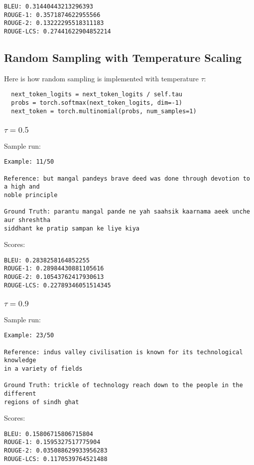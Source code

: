 \documentclass[a4paper,12pt]{article}
\begin{document}
\begin{verbatim}
BLEU: 0.31440443213296393
ROUGE-1: 0.3571874622955566
ROUGE-2: 0.13222295518311183
ROUGE-LCS: 0.27441622904852214
\end{verbatim}


\subsection{Random Sampling with Temperature Scaling}
Here is how random sampling is implemented with temperature $\tau$:
\begin{verbatim}
  next_token_logits = next_token_logits / self.tau
  probs = torch.softmax(next_token_logits, dim=-1)
  next_token = torch.multinomial(probs, num_samples=1)
\end{verbatim}


\subsubsection{$\tau = 0.5$}
Sample run:
\begin{verbatim}
Example: 11/50

Reference: but mangal pandeys brave deed was done through devotion to a high and 
noble principle

Ground Truth: parantu mangal pande ne yah saahsik kaarnama aeek unche aur shreshtha
siddhant ke pratip sampan ke liye kiya
\end{verbatim}
Scores:
\begin{verbatim}
BLEU: 0.2838258164852255
ROUGE-1: 0.28984430881105616
ROUGE-2: 0.10543762417930613
ROUGE-LCS: 0.22789346051514345
\end{verbatim}

\subsubsection{$\tau = 0.9$}
Sample run:
\begin{verbatim}
Example: 23/50

Reference: indus valley civilisation is known for its technological knowledge 
in a variety of fields

Ground Truth: trickle of technology reach down to the people in the different 
regions of sindh ghat
\end{verbatim}
Scores:
\begin{verbatim}
BLEU: 0.15806715806715804
ROUGE-1: 0.1595327517775904
ROUGE-2: 0.035088629933956283
ROUGE-LCS: 0.1170539764521488
\end{verbatim}
\end{document}
